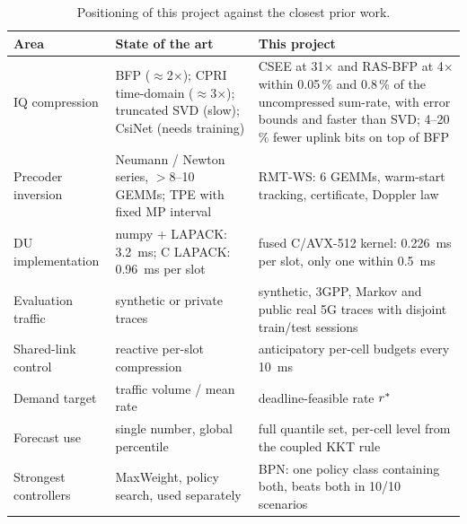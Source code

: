 \begin{table}[H]
\caption{Positioning of this project against the closest prior work.}
\label{tab:gap}
\centering\small
\renewcommand{\arraystretch}{1.25}
\begin{tabularx}{\textwidth}{>{\raggedright\arraybackslash}p{3.6cm}>{\raggedright\arraybackslash}X>{\raggedright\arraybackslash}X}
\toprule
Area & State of the art & This project \\
\midrule
IQ compression & BFP ($\approx$2$\times$); CPRI time-domain ($\approx$3$\times$); truncated SVD (slow); CsiNet (needs training) & CSEE at 31$\times$ and RAS-BFP at 4$\times$ within 0.05\,\% and 0.8\,\% of the uncompressed sum-rate, with error bounds and faster than SVD; 4--20\,\% fewer uplink bits on top of BFP \\
Precoder inversion & Neumann / Newton series, $>$8--10 GEMMs; TPE with fixed MP interval & RMT-WS: 6 GEMMs, warm-start tracking, certificate, Doppler law \\
DU implementation & numpy + LAPACK: 3.2~ms; C LAPACK: 0.96~ms per slot & fused C/AVX-512 kernel: 0.226~ms per slot, only one within 0.5~ms \\
Evaluation traffic & synthetic or private traces & synthetic, 3GPP, Markov and public real 5G traces with disjoint train/test sessions \\
Shared-link control & reactive per-slot compression~\cite{lagen2022} & anticipatory per-cell budgets every 10~ms \\
Demand target & traffic volume / mean rate & deadline-feasible rate $r^{\ast}$ \\
Forecast use & single number, global percentile & full quantile set, per-cell level from the coupled KKT rule \\
Strongest controllers & MaxWeight, policy search, used separately & BPN: one policy class containing both, beats both in 10/10 scenarios \\
\bottomrule
\end{tabularx}
\end{table}

